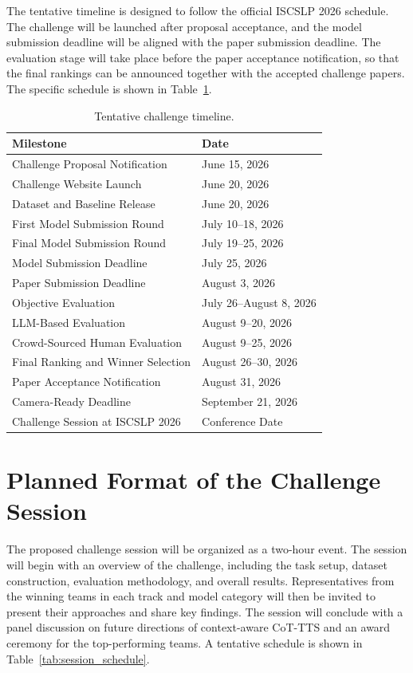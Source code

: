 \documentclass[a4paper]{article}
\begin{document}
The tentative timeline is designed to follow the official ISCSLP 2026 schedule. The challenge will be launched after proposal acceptance, and the model submission deadline will be aligned with the paper submission deadline. The evaluation stage will take place before the paper acceptance notification, so that the final rankings can be announced together with the accepted challenge papers. The specific schedule is shown in Table~\ref{tab:timeline}.\\

\begin{table}[h]
\caption{Tentative challenge timeline.}
\label{tab:timeline}
\centering
\begin{tabular}{ll}
\toprule
\textbf{Milestone} & \textbf{Date} \\
\midrule
Challenge Proposal Notification & June 15, 2026 \\
Challenge Website Launch & June 20, 2026 \\
Dataset and Baseline Release & June 20, 2026 \\
First Model Submission Round & July 10--18, 2026 \\
Final Model Submission Round & July 19--25, 2026 \\
Model Submission Deadline & July 25, 2026 \\
Paper Submission Deadline & August 3, 2026 \\
Objective Evaluation & July 26--August 8, 2026 \\
LLM-Based Evaluation & August 9--20, 2026 \\
Crowd-Sourced Human Evaluation & August 9--25, 2026 \\
Final Ranking and Winner Selection & August 26--30, 2026 \\
Paper Acceptance Notification & August 31, 2026 \\
Camera-Ready Deadline & September 21, 2026 \\
Challenge Session at ISCSLP 2026 & Conference Date \\
\bottomrule
\end{tabular}
\end{table}


\section{Planned Format of the Challenge Session}

The proposed challenge session will be organized as a two-hour event. The session will begin with an overview of the challenge, including the task setup, dataset construction, evaluation methodology, and overall results. Representatives from the winning teams in each track and model category will then be invited to present their approaches and share key findings. The session will conclude with a panel discussion on future directions of context-aware CoT-TTS and an award ceremony for the top-performing teams. A tentative schedule is shown in Table~\ref{tab:session_schedule}.\\
\end{document}
